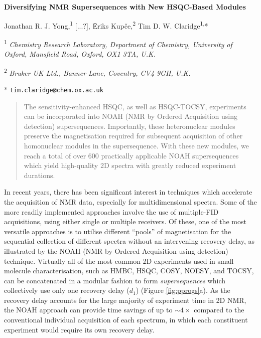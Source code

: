 \documentclass[11pt]{article}
\newcommand*{\hl}[1]{\textcolor{WildStrawberry}{#1}}
\newcommand*{\proton}{\ce{^{1}H}}
\newcommand*{\figref}[1]{Figure \ref{fig:#1}}
\begin{document}
\begin{center}
    \Large \textbf{Diversifying NMR Supersequences with New HSQC-Based Modules}

    \vspace{0.2cm}

    \large Jonathan R. J. Yong,\textsuperscript{1} \hl{[...?],} {\=E}riks Kup{\v{c}}e,\textsuperscript{2} Tim D. W. Claridge\textsuperscript{1,}*

    \vspace{0.2cm}

    \normalsize

    \textsuperscript{1} \textit{Chemistry Research Laboratory, Department of Chemistry, University of Oxford, Mansfield Road, Oxford, OX1 3TA, U.K.}

    \textsuperscript{2} \textit{Bruker UK Ltd., Banner Lane, Coventry, CV4 9GH, U.K.}

    * \texttt{tim.claridge@chem.ox.ac.uk}
\end{center}
\vspace{0.5cm}
\begin{abstract}
    The sensitivity-enhanced HSQC, as well as HSQC-TOCSY, experiments can be incorporated into NOAH (NMR by Ordered Acquisition using \proton{} detection) supersequences.
    Importantly, these heteronuclear modules preserve the magnetisation required for subsequent acquisition of other homonuclear modules in the supersequence.
    With these new modules, we reach a total of over 600 practically applicable NOAH supersequences which yield high-quality 2D spectra with greatly reduced experiment durations.
\end{abstract}


In recent years, there has been significant interest in techniques which accelerate the acquisition of NMR data, especially for multidimensional spectra.\autocite{ultrafast, timeshared, multireceive}
Some of the more readily implemented approaches involve the use of multiple-FID acquisitions, using either single or multiple receivers.
Of these, one of the most versatile approaches is to utilise different ``pools'' of magnetisation for the sequential collection of different spectra without an intervening recovery delay, as illustrated by the NOAH (NMR by Ordered Acquisition using \proton{} detection) technique.\autocite{noah}
Virtually all of the most common 2D experiments used in small molecule characterisation, such as HMBC, HSQC, COSY, NOESY, and TOCSY, can be concatenated in a modular fashion to form \textit{supersequences} which collectively use only one recovery delay ($d_1$) (\figref{pprogs}a).
As the recovery delay accounts for the large majority of experiment time in 2D NMR, the NOAH approach can provide time savings of up to $\sim 4\times$ compared to the conventional individual acquisition of each spectrum, in which each constituent experiment would require its own recovery delay.
\end{document}
